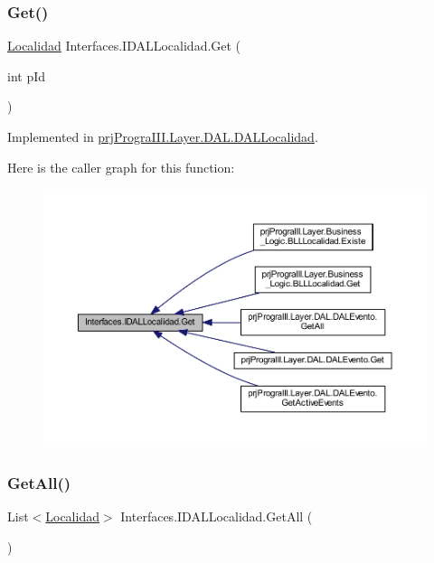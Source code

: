 \subsubsection{\texorpdfstring{Get()}{Get()}}
{\footnotesize\ttfamily \hyperlink{classprj_progra_i_i_i_1_1_layer_1_1_entities_1_1_localidad}{Localidad} Interfaces.\+I\+D\+A\+L\+Localidad.\+Get (\begin{DoxyParamCaption}\item[{int}]{p\+Id }\end{DoxyParamCaption})}



Implemented in \hyperlink{classprj_progra_i_i_i_1_1_layer_1_1_d_a_l_1_1_d_a_l_localidad_a0763adaaedb581f36a311344b109ef83}{prj\+Progra\+I\+I\+I.\+Layer.\+D\+A\+L.\+D\+A\+L\+Localidad}.

Here is the caller graph for this function\+:
\nopagebreak
\begin{figure}[H]
\begin{center}
\leavevmode
\includegraphics[width=350pt]{interface_interfaces_1_1_i_d_a_l_localidad_afc7b2ff5ab6188af4b0c9c1f77961a6c_icgraph}
\end{center}
\end{figure}
\hypertarget{interface_interfaces_1_1_i_d_a_l_localidad_ab0985713e92391e4d781cf8bcf3eba45}{}\label{interface_interfaces_1_1_i_d_a_l_localidad_ab0985713e92391e4d781cf8bcf3eba45} 
\subsubsection{\texorpdfstring{Get\+All()}{GetAll()}}
{\footnotesize\ttfamily List$<$\hyperlink{classprj_progra_i_i_i_1_1_layer_1_1_entities_1_1_localidad}{Localidad}$>$ Interfaces.\+I\+D\+A\+L\+Localidad.\+Get\+All (\begin{DoxyParamCaption}{ }\end{DoxyParamCaption})}



